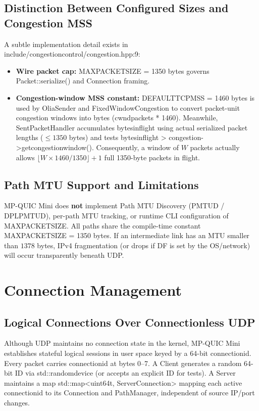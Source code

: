 \documentclass[10pt,a4paper]{article}
\newcommand{\codeul}{\textunderscore\hspace{0pt}}
\DeclareRobustCommand{\code}[1]{{\ttfamily\let\_\codeul #1}}
\begin{document}
\subsection{Distinction Between Configured Sizes and Congestion MSS}
A subtle implementation detail exists in \code{include/congestion\_control/congestion.hpp:9}:
\begin{itemize}
    \item \textbf{Wire packet cap:} \code{MAX\_PACKET\_SIZE = 1350} bytes governs \code{Packet::serialize()} and \code{Connection} framing.
    \item \textbf{Congestion-window MSS constant:} \code{DEFAULT\_TCP\_MSS = 1460} bytes is used by \code{OliaSender} and \code{FixedWindowCongestion} to convert packet-unit congestion windows into bytes (\code{cwnd\_packets * 1460}). Meanwhile, \code{SentPacketHandler} accumulates \code{bytes\_in\_flight} using actual serialized packet lengths ($\le 1350$ bytes) and tests \code{bytes\_in\_flight > congestion->get\_congestion\_window()}. Consequently, a window of $W$ packets actually allows $\lfloor W \times 1460 / 1350 \rfloor + 1$ full 1350-byte packets in flight.
\end{itemize}

\subsection{Path MTU Support and Limitations}
MP-QUIC Mini does \textbf{not} implement Path MTU Discovery (PMTUD / DPLPMTUD), per-path MTU tracking, or runtime CLI configuration of \code{MAX\_PACKET\_SIZE}. All paths share the compile-time constant \code{MAX\_PACKET\_SIZE = 1350} bytes. If an intermediate link has an MTU smaller than $1378$ bytes, IPv4 fragmentation (or drops if DF is set by the OS/network) will occur transparently beneath UDP.

\section{Connection Management}

\subsection{Logical Connections Over Connectionless UDP}
Although UDP maintains no connection state in the kernel, MP-QUIC Mini establishes stateful logical sessions in user space keyed by a 64-bit \code{connection\_id}. Every packet carries \code{connection\_id} at bytes 0--7. A \code{Client} generates a random 64-bit ID via \code{std::random\_device} (or accepts an explicit ID for tests). A \code{Server} maintains a map \code{std::map<uint64\_t, ServerConnection>} mapping each active \code{connection\_id} to its \code{Connection} and \code{PathManager}, independent of source IP/port changes.
\end{document}

